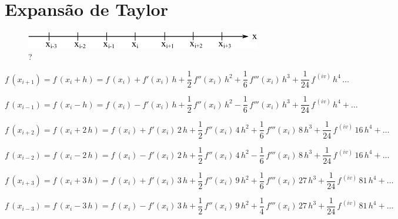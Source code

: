 \section{Expansão de Taylor}

\begin{figure}[htb]
 \centering
 \includegraphics[scale=1.0]{capitulos/capitulo3/figuras/exp_taylor1.png}
 \caption{?}
 \label{fig:exp_taylor1}
\end{figure}

\begin{equation}
 \label{cap3:sec1:eq1}
 f\,(x_{i+1}) = f\,(x_i+h) = f\,(x_i) + f'(x_i)\,h + \displaystyle \frac{1}{2}\,f''(x_i)\,h^2 + \frac{1}{6}\,f'''(x_i)\,h^3 + \frac{1}{24}\,f^{\,(iv)}\,h^4 \, \ldots
\end{equation}

\begin{equation}
 \label{cap3:sec1:eq2}
 f\,(x_{i-1}) = f\,(x_i-h) = f\,(x_i) - f'(x_i)\,h + \displaystyle \frac{1}{2}\,f''(x_i)\,h^2 - \frac{1}{6}\,f'''(x_i)\,h^3 + \frac{1}{24}\,f^{\,(iv)}\,h^4 + \ldots
\end{equation}

\begin{equation}
 \label{cap3:sec1:eq3}
 f\,(x_{i+2}) = f\,(x_i+2\,h) = f\,(x_i) + f'(x_i)\,2\,h + \displaystyle \frac{1}{2}\,f''(x_i)\,4\,h^2 + \frac{1}{6}\,f'''(x_i)\,8\,h^3 + \frac{1}{24}\,f^{\,(iv)}\,16\,h^4 + \ldots
\end{equation}

\begin{equation}
 \label{cap3:sec1:eq4}
 f\,(x_{i-2}) = f\,(x_i-2\,h) = f\,(x_i) - f'(x_i)\,2\,h + \displaystyle \frac{1}{2}\,f''(x_i)\,4\,h^2 - \frac{1}{6}\,f'''(x_i)\,8\,h^3 + \frac{1}{24}\,f^{\,(iv)}\,16\,h^4 + \ldots
\end{equation}

\begin{equation}
 \label{cap3:sec1:eq5}
 f\,(x_{i+3}) = f\,(x_i+3\,h) = f\,(x_i) + f'(x_i)\,3\,h + \displaystyle \frac{1}{2}\,f''(x_i)\,9\,h^2 + \frac{1}{6}\,f'''(x_i)\,27\,h^3 + \frac{1}{24}\,f^{\,(iv)}\,81\,h^4 + \ldots
\end{equation}

\begin{equation}
 \label{cap3:sec1:eq6}
 f\,(x_{i-3}) = f\,(x_i-3\,h) = f\,(x_i) - f'(x_i)\,3\,h + \displaystyle \frac{1}{2}\,f''(x_i)\,9\,h^2 + \frac{1}{4}\,f'''(x_i)\,27\,h^3 + \frac{1}{24}\,f^{\,(iv)}\,81\,h^4 + \ldots
\end{equation}

